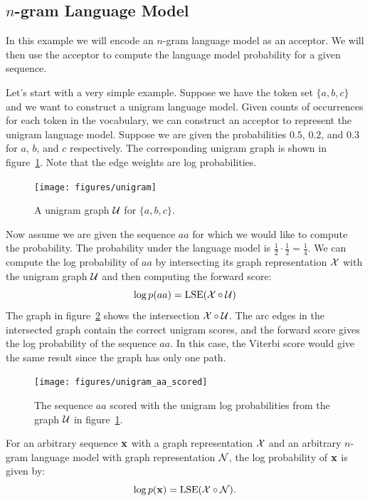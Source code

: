 \subsection{$n$-gram Language Model}
\label{sec:ngram_model}

In this example we will encode an $n$-gram language model as an acceptor. We
will then use the acceptor to compute the language model probability for a
given sequence.

Let's start with a very simple example. Suppose we have the token set $\{a, b,
c\}$ and we want to construct a unigram language model. Given counts of
occurrences for each token in the vocabulary, we can construct an acceptor to
represent the unigram language model. Suppose we are given the probabilities
$0.5$, $0.2$, and $0.3$ for $a$, $b$, and $c$ respectively. The corresponding
unigram graph is shown in figure~\ref{fig:unigram}. Note that the edge weights
are log probabilities.

\begin{figure}
    \centering
    \texttt{[image: figures/unigram]}
    \caption{A unigram graph $\mathcal{U}$ for $\{a, b, c\}$.}
    \label{fig:unigram}
\end{figure}

Now assume we are given the sequence $aa$ for which we would like to compute
the probability. The probability under the language model is $\frac{1}{2} \cdot
\frac{1}{2} = \frac{1}{4}$. We can compute the log probability of $aa$ by
intersecting its graph representation $\mathcal{X}$ with the unigram graph $\mathcal{U}$ and
then computing the forward score:
$$
\log p(aa) = \operatorname*{\textrm{LSE}} (\mathcal{X} \circ \mathcal{U})
$$
The graph in figure~\ref{fig:unigram_aa_scored} shows the intersection $\mathcal{X}
\circ \mathcal{U}$. The arc edges in the intersected graph contain the correct unigram
scores, and the forward score gives the log probability of the sequence $aa$.
In this case, the Viterbi score would give the same result since the graph has
only one path.

\begin{figure}
    \centering
    \texttt{[image: figures/unigram\_aa\_scored]}
    \caption{The sequence $aa$ scored with the unigram log probabilities from
    the graph $\mathcal{U}$ in figure~\ref{fig:unigram}.}
    \label{fig:unigram_aa_scored}
\end{figure}

For an arbitrary sequence ${\bf x}$ with a graph representation $\mathcal{X}$ and an
arbitrary $n$-gram language model with graph representation $\mathcal{N}$, the log
probability of ${\bf x}$ is given by:
$$
\log p({\bf x}) = \operatorname*{\textrm{LSE}}(\mathcal{X} \circ \mathcal{N}).
$$

